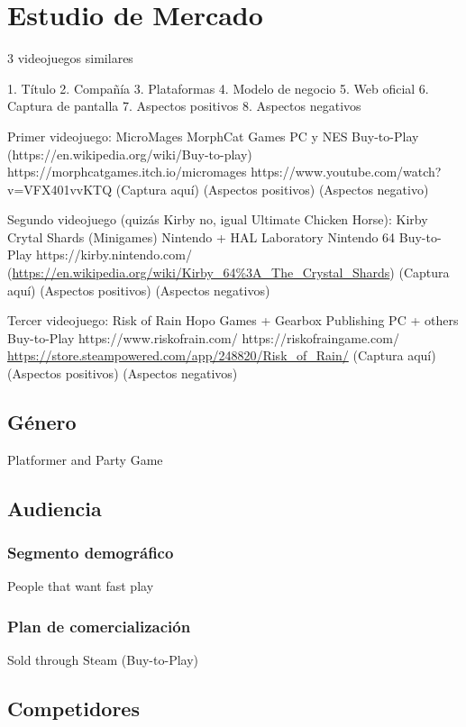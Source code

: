 \chapter{Estudio de Mercado}

3 videojuegos similares

    1. Título
    2. Compañía
    3. Plataformas
    4. Modelo de negocio
    5. Web oficial
    6. Captura de pantalla
    7. Aspectos positivos
    8. Aspectos negativos

Primer videojuego:
    MicroMages
    MorphCat Games
    PC y NES
    Buy-to-Play (https://en.wikipedia.org/wiki/Buy-to-play)
    https://morphcatgames.itch.io/micromages
    https://www.youtube.com/watch?v=VFX401vvKTQ
    (Captura aquí)
    (Aspectos positivos)
    (Aspectos negativo)

Segundo videojuego (quizás Kirby no, igual Ultimate Chicken Horse):
    Kirby Crytal Shards (Minigames)
    Nintendo + HAL Laboratory
    Nintendo 64
    Buy-to-Play
    https://kirby.nintendo.com/ (\url{https://en.wikipedia.org/wiki/Kirby_64\%3A_The_Crystal_Shards})
    (Captura aquí)
    (Aspectos positivos)
    (Aspectos negativos)

Tercer videojuego:
    Risk of Rain
    Hopo Games + Gearbox Publishing
    PC + others
    Buy-to-Play
    https://www.riskofrain.com/
    https://riskofraingame.com/
    \url{https://store.steampowered.com/app/248820/Risk_of_Rain/}
    (Captura aquí)
    (Aspectos positivos)
    (Aspectos negativos)

\section{Género}

Platformer and Party Game

\section{Audiencia}

\subsection{Segmento demográfico}
People that want fast play

\subsection{Plan de comercialización}
Sold through Steam (Buy-to-Play)

\section{Competidores}


